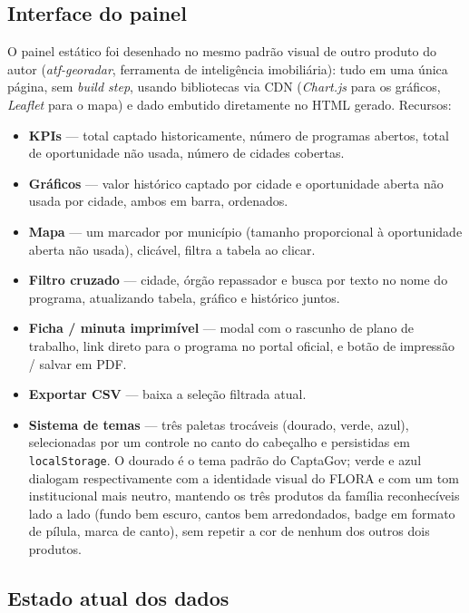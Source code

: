 \documentclass[11pt,a4paper]{article}
\newcommand{\codigo}[1]{\texttt{\small #1}}
\begin{document}
\subsection{Interface do painel}

O painel estático foi desenhado no mesmo padrão visual de outro produto do autor
(\emph{atf-georadar}, ferramenta de inteligência imobiliária): tudo em uma única página,
sem \emph{build step}, usando bibliotecas via CDN (\emph{Chart.js} para os gráficos,
\emph{Leaflet} para o mapa) e dado embutido diretamente no HTML gerado. Recursos:

\begin{itemize}
  \item \textbf{KPIs} --- total captado historicamente, número de programas abertos, total de
    oportunidade não usada, número de cidades cobertas.
  \item \textbf{Gráficos} --- valor histórico captado por cidade e oportunidade aberta não
    usada por cidade, ambos em barra, ordenados.
  \item \textbf{Mapa} --- um marcador por município (tamanho proporcional à oportunidade
    aberta não usada), clicável, filtra a tabela ao clicar.
  \item \textbf{Filtro cruzado} --- cidade, órgão repassador e busca por texto no nome do
    programa, atualizando tabela, gráfico e histórico juntos.
  \item \textbf{Ficha / minuta imprimível} --- modal com o rascunho de plano de trabalho, link
    direto para o programa no portal oficial, e botão de impressão / salvar em PDF.
  \item \textbf{Exportar CSV} --- baixa a seleção filtrada atual.
  \item \textbf{Sistema de temas} --- três paletas trocáveis (dourado, verde, azul),
    selecionadas por um controle no canto do cabeçalho e persistidas em
    \codigo{localStorage}. O dourado é o tema padrão do CaptaGov; verde e azul dialogam
    respectivamente com a identidade visual do FLORA e com um tom institucional mais neutro,
    mantendo os três produtos da família reconhecíveis lado a lado (fundo bem escuro, cantos
    bem arredondados, badge em formato de pílula, marca de canto), sem repetir a cor de nenhum
    dos outros dois produtos.
\end{itemize}

\subsection{Estado atual dos dados}
\end{document}
